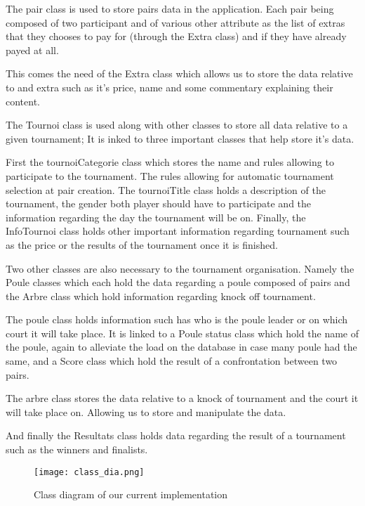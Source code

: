 The pair class is used to store pairs data in the application. Each pair being composed of two participant and of various other attribute as the list of extras that they chooses to pay for (through the Extra class) and if they have already payed at all. \newline

This comes the need of the Extra class which allows us to store the data relative to and extra such as it's price, name and some commentary explaining their content.\newline

The Tournoi class is used along with other classes to store all data relative to a given tournament; It is inked to three important classes that help store it's data.

First the tournoiCategorie class which stores the name and rules allowing to participate to the tournament. The rules allowing for automatic tournament selection at pair creation. 
The tournoiTitle class holds a description of the tournament, the gender both player should have to participate and the information regarding the day the tournament will be on.
Finally, the InfoTournoi class holds other important information regarding tournament such as the price or the results of the tournament once it is finished.

Two other classes are also necessary to the tournament organisation. Namely the Poule classes which each hold the data regarding a poule composed of pairs and the Arbre class which hold information regarding knock off tournament.\newline

The poule class holds information such has who is the poule leader or on which court it will take place. It is linked to a Poule status class which hold the name of the poule, again to alleviate the load on the database in case many poule had the same, and a Score class which hold the result of a confrontation between two pairs.\newline

The arbre class stores the data relative to a knock of tournament and the court it will take place on. Allowing us to store and manipulate the data.\newline

And finally the Resultats class holds data regarding the result of a tournament such as the winners and finalists. \newline

\begin{figure}[!ht]
	\centering
	\texttt{[image: class\_dia.png]}
	\caption{Class diagram of our current implementation}
	\label{fig:length_eight_mouse}
\end{figure}
\FloatBarrier